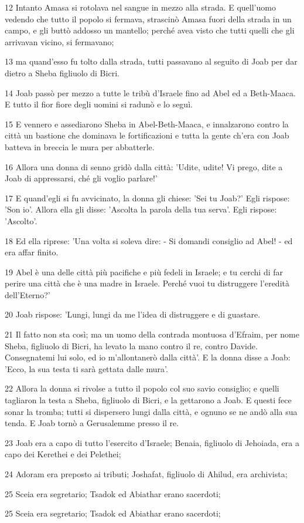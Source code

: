 \par 12 Intanto Amasa si rotolava nel sangue in mezzo alla strada. E quell'uomo vedendo che tutto il popolo si fermava, strascinò Amasa fuori della strada in un campo, e gli buttò addosso un mantello; perché avea visto che tutti quelli che gli arrivavan vicino, si fermavano;
\par 13 ma quand'esso fu tolto dalla strada, tutti passavano al seguito di Joab per dar dietro a Sheba figliuolo di Bicri.
\par 14 Joab passò per mezzo a tutte le tribù d'Israele fino ad Abel ed a Beth-Maaca. E tutto il fior fiore degli uomini si radunò e lo seguì.
\par 15 E vennero e assediarono Sheba in Abel-Beth-Maaca, e innalzarono contro la città un bastione che dominava le fortificazioni e tutta la gente ch'era con Joab batteva in breccia le mura per abbatterle.
\par 16 Allora una donna di senno gridò dalla città: 'Udite, udite! Vi prego, dite a Joab di appressarsi, ché gli voglio parlare!'
\par 17 E quand'egli si fu avvicinato, la donna gli chiese: 'Sei tu Joab?' Egli rispose: 'Son io'. Allora ella gli disse: 'Ascolta la parola della tua serva'. Egli rispose: 'Ascolto'.
\par 18 Ed ella riprese: 'Una volta si soleva dire: - Si domandi consiglio ad Abel! - ed era affar finito.
\par 19 Abel è una delle città più pacifiche e più fedeli in Israele; e tu cerchi di far perire una città che è una madre in Israele. Perché vuoi tu distruggere l'eredità dell'Eterno?'
\par 20 Joab rispose: 'Lungi, lungi da me l'idea di distruggere e di guastare.
\par 21 Il fatto non sta così; ma un uomo della contrada montuosa d'Efraim, per nome Sheba, figliuolo di Bicri, ha levato la mano contro il re, contro Davide. Consegnatemi lui solo, ed io m'allontanerò dalla città'. E la donna disse a Joab: 'Ecco, la sua testa ti sarà gettata dalle mura'.
\par 22 Allora la donna si rivolse a tutto il popolo col suo savio consiglio; e quelli tagliaron la testa a Sheba, figliuolo di Bicri, e la gettarono a Joab. E questi fece sonar la tromba; tutti si dispersero lungi dalla città, e ognuno se ne andò alla sua tenda. E Joab tornò a Gerusalemme presso il re.
\par 23 Joab era a capo di tutto l'esercito d'Israele; Benaia, figliuolo di Jehoiada, era a capo dei Kerethei e dei Pelethei;
\par 24 Adoram era preposto ai tributi; Joshafat, figliuolo di Ahilud, era archivista;
\par 25 Sceia era segretario; Tsadok ed Abiathar erano sacerdoti;
\par 25 Sceia era segretario; Tsadok ed Abiathar erano sacerdoti;

